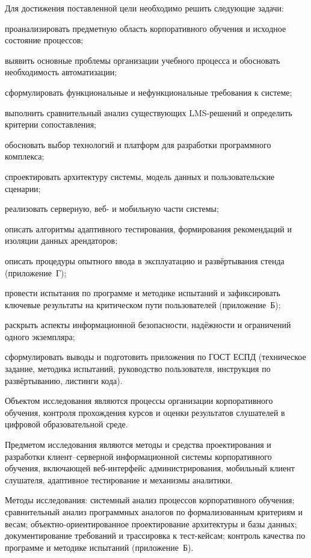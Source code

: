 Для достижения поставленной цели необходимо решить следующие задачи:
\begin{parenlist}
  \item проанализировать предметную область корпоративного обучения и исходное состояние процессов;
  \item выявить основные проблемы организации учебного процесса и обосновать необходимость автоматизации;
  \item сформулировать функциональные и нефункциональные требования к системе;
  \item выполнить сравнительный анализ существующих LMS-решений и определить критерии сопоставления;
  \item обосновать выбор технологий и платформ для разработки программного комплекса;
  \item спроектировать архитектуру системы, модель данных и пользовательские сценарии;
  \item реализовать серверную, веб- и мобильную части системы;
  \item описать алгоритмы адаптивного тестирования, формирования рекомендаций и изоляции данных арендаторов;
  \item описать процедуры опытного ввода в эксплуатацию и развёртывания стенда (приложение~Г);
  \item провести испытания по программе и методике испытаний и зафиксировать ключевые результаты на критическом пути пользователей (приложение~Б);
  \item раскрыть аспекты информационной безопасности, надёжности и ограничений одного экземпляра;
  \item сформулировать выводы и подготовить приложения по ГОСТ ЕСПД (техническое задание, методика испытаний, руководство пользователя, инструкция по развёртыванию, листинги кода).
\end{parenlist}

Объектом исследования являются процессы организации корпоративного обучения, контроля прохождения курсов и оценки результатов слушателей в цифровой образовательной среде.

Предметом исследования являются методы и средства проектирования и разработки клиент--серверной информационной системы корпоративного обучения, включающей веб-интерфейс администрирования, мобильный клиент слушателя, адаптивное тестирование и механизмы аналитики.

Методы исследования: системный анализ процессов корпоративного обучения; сравнительный анализ программных аналогов по формализованным критериям и весам; объектно-ориентированное проектирование архитектуры и базы данных; документирование требований и трассировка к тест-кейсам; контроль качества по программе и методике испытаний (приложение~Б)\cite{grekul_proj_is,kulikov_testing_2024,gost7052008}.

